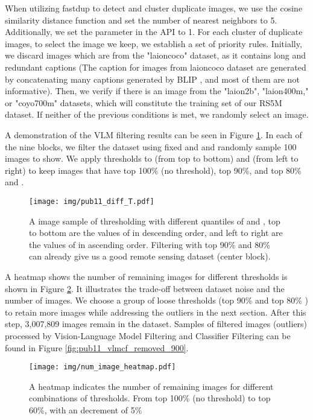 \documentclass[journal]{IEEEtran}
\begin{document}
When utilizing fastdup to detect and cluster duplicate images, we use the cosine similarity distance function and set the number of nearest neighbors to 5. Additionally, we set the  parameter in the  API to 1. For each cluster of duplicate images, to select the image we keep, we establish a set of priority rules. Initially, we discard images which are from the "laioncoco" dataset, as it contains long and redundant captions (The caption for images from laioncoco dataset are generated by concatenating many captions generated by BLIP \cite{blip}, and most of them are not informative). Then, we verify if there is an image from the "laion2b", "laion400m," or "coyo700m" datasets, which will constitute the training set of our RS5M dataset. If neither of the previous conditions is met, we randomly select an image.

A demonstration of the VLM filtering results can be seen in Figure \ref{fig:grid_random}. In each of the nine blocks, we filter the dataset using fixed  and  and randomly sample 100 images to show. We apply thresholds to  (from top to bottom) and  (from left to right) to keep images that have top 100\% (no threshold), top 90\%, and top 80\%  and . 

\begin{figure}[H]
    \centering
    \texttt{[image: img/pub11\_diff\_T.pdf]}
    \caption{A image sample of thresholding with different quantiles of  and , top to bottom are the values of  in descending order, and left to right are the values of  in ascending order. Filtering with top 90\%  and 80\%  can already give us a good remote sensing dataset (center block).}
    \label{fig:grid_random}
\end{figure}

A heatmap shows the number of remaining images for different thresholds is shown in Figure \ref{fig:num_image_heatmap}. It illustrates the trade-off between dataset noise and the number of images. We choose a group of loose thresholds (top 90\%  and top 80\% ) to retain more images while addressing the outliers in the next section. After this step, 3,007,809 images remain in the dataset. Samples of filtered images (outliers) processed by Vision-Language Model Filtering and Classifier Filtering can be found in Figure \ref{fig:pub11_vlmcf_removed_900}.

\begin{figure}[htbp]
    \centering
    \texttt{[image: img/num\_image\_heatmap.pdf]}
    \caption{A heatmap indicates the number of remaining images for different combinations of thresholds. From top 100\% (no threshold) to top 60\%, with an decrement of 5\%}
    \label{fig:num_image_heatmap}
\end{figure}
\end{document}
